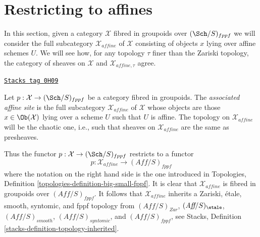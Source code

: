 \section{Restricting to affines}
\label{stacks-sheaves-section-alternative}
In this section, given a category $\mathcal{X}$ fibred in groupoids over
$(\Sch/S)_{fppf}$ we will consider the full subcategory $\mathcal{X}_{affine}$
of $\mathcal{X}$ consisting of objects $x$ lying over affine schemes $U$.
We will see how, for any topology $\tau$ finer than the Zariski topology,
the category of sheaves on $\mathcal{X}$ and $\mathcal{X}_{affine, \tau}$
agree.

\begin{definition}[Alternative]
\label{stacks-sheaves-definition-alternative}
\href{https://stacks.math.columbia.edu/tag/0H09}{\texttt{Stacks tag 0H09}}

Let $p : \mathcal{X} \to (\Sch/S)_{fppf}$ be a category fibred in groupoids.
The {\it associated affine site} is the full subcategory
$\mathcal{X}_{affine}$ of $\mathcal{X}$ whose objects are those
$x \in \Ob(\mathcal{X})$ lying over a scheme $U$ such that $U$
is affine. The topology on $\mathcal{X}_{affine}$ will be the chaotic one,
i.e., such that sheaves on $\mathcal{X}_{affine}$ are the same as presheaves.
\end{definition}

Thus the functor $p : \mathcal{X} \to (\Sch/S)_{fppf}$ restricts to a functor
$$
p : \mathcal{X}_{affine} \longrightarrow (\textit{Aff}/S)_{fppf}
$$
where the notation on the right hand side is the one introduced in
Topologies, Definition \ref{topologies-definition-big-small-fppf}.
It is clear that $\mathcal{X}_{affine}$ is fibred in groupoids over
$(\textit{Aff}/S)_{fppf}$. It follows that $\mathcal{X}_{affine}$
inherits a Zariski, \'etale, smooth, syntomic, and fppf topology
from $(\textit{Aff}/S)_{Zar}$, $(\textit{Aff}/S)_\etale$,
$(\textit{Aff}/S)_{smooth}$, $(\textit{Aff}/S)_{syntomic}$, and
$(\textit{Aff}/S)_{fppf}$, see
Stacks, Definition \ref{stacks-definition-topology-inherited}.

